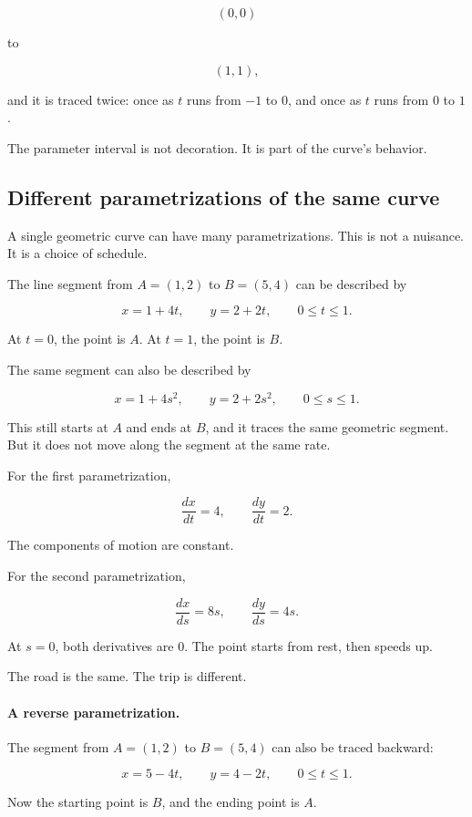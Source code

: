 \[
(0,0)
\]

to

\[
(1,1),
\]

and it is traced twice: once as \(t\) runs from \(-1\) to \(0\), and once as \(t\) runs
from \(0\) to \(1\).

The parameter interval is not decoration.  It is part of the curve's behavior.

\subsection{Different parametrizations of the same curve}
\label{subsec:different-parametrizations-same-curve}

A single geometric curve can have many parametrizations.  This is not a nuisance.  It is
a choice of schedule.

The line segment from \(A=(1,2)\) to \(B=(5,4)\) can be described by

\[
x=1+4t,
\qquad
y=2+2t,
\qquad
0\le t\le 1.
\]

At \(t=0\), the point is \(A\).  At \(t=1\), the point is \(B\).

The same segment can also be described by

\[
x=1+4s^2,
\qquad
y=2+2s^2,
\qquad
0\le s\le 1.
\]

This still starts at \(A\) and ends at \(B\), and it traces the same geometric segment.
But it does not move along the segment at the same rate.

For the first parametrization,

\[
\frac{dx}{dt}=4,
\qquad
\frac{dy}{dt}=2.
\]

The components of motion are constant.

For the second parametrization,

\[
\frac{dx}{ds}=8s,
\qquad
\frac{dy}{ds}=4s.
\]

At \(s=0\), both derivatives are \(0\).  The point starts from rest, then speeds up.

The road is the same.  The trip is different.

\paragraph{A reverse parametrization.}
The segment from \(A=(1,2)\) to \(B=(5,4)\) can also be traced backward:

\[
x=5-4t,
\qquad
y=4-2t,
\qquad
0\le t\le 1.
\]

Now the starting point is \(B\), and the ending point is \(A\).

